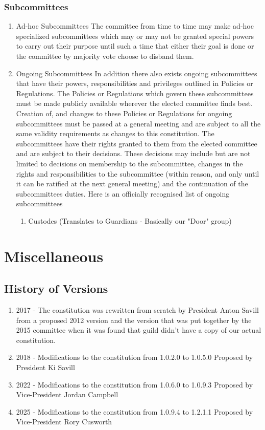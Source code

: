 \documentclass[10pt,a4paper]{report}
\begin{document}
		\subsection{Subcommittees}
			\begin{enumerate}[label=\arabic*]
			\item Ad-hoc Subcommittees
				The committee from time to time may make ad-hoc specialized subcommittees which may or may not be granted special powers to carry out their purpose until such a time that either their goal is done or the committee by majority vote choose to disband them.
			\item Ongoing Subcommittees 
				In addition there also exists ongoing subcommittees that have their powers, responsibilities and privileges outlined in Policies or Regulations.
				The Policies or Regulations which govern these subcommittees must be made publicly available wherever the elected committee finds best.
				Creation of, and changes to these Policies or Regulations for ongoing subcommittees must be passed at a general meeting and are subject to all the same validity requirements as changes to this constitution.
				The subcommittees have their rights granted to them from the elected committee and are subject to their decisions. These decisions may include but are not limited to decisions on membership to the subcommittee, changes in the rights and responsibilities to the subcommittee (within reason, and only until it can be ratified at the next general meeting) and the continuation of the subcommittees duties.
				Here is an officially recognised list of ongoing subcommittees
				\begin{enumerate}[label=\arabic*]
					\item Custodes (Translates to Guardians - Basically our "Door" group)
				\end{enumerate}
				\end{enumerate}

	\chapter{Miscellaneous}
		\section{History of Versions}
		    \begin{enumerate}[label=\arabic*]
			\item 2017 - The constitution was rewritten from scratch by President Anton Savill from a proposed 2012 version and the version that was put together by the 2015 committee when it was found that guild didn't have a copy of our actual constitution.
			\item 2018 - Modifications to the constitution from 1.0.2.0 to 1.0.5.0 Proposed by President Ki Savill
			\item 2022 - Modifications to the constitution from 1.0.6.0 to 1.0.9.3 Proposed by Vice-President Jordan Campbell
			\item 2025 - Modifications to the constitution from 1.0.9.4 to 1.2.1.1 Proposed by Vice-President Rory Cusworth
			\end{enumerate}
\end{document}
